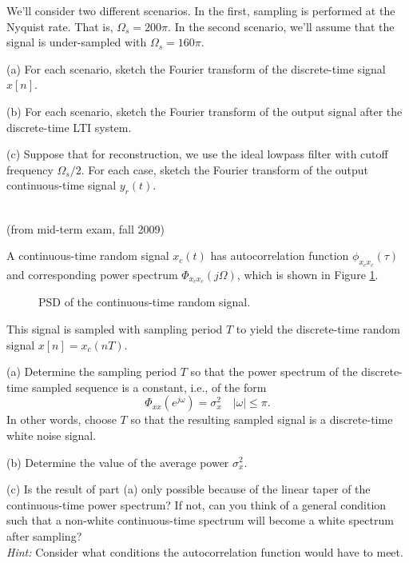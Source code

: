 \documentclass[12pt]{report}
\begin{document}
We'll consider two different scenarios. In the first, sampling is performed at the Nyquist rate. That is, $\Omega_s = 200\pi$. In the second scenario, we'll assume that the signal is under-sampled with $\Omega_s = 160\pi$.

\begin{description}
	\item{(a)} For each scenario, sketch the Fourier transform of the discrete-time signal $x[n]$.
	\item{(b)} For each scenario, sketch the Fourier transform of the output signal after the discrete-time LTI system.
	\item{(c)} Suppose that for reconstruction, we use the ideal lowpass filter with cutoff frequency $\Omega_s/2$. For each case, sketch the Fourier transform of the output continuous-time signal $y_r(t)$.
\end{description}
\mbox{}\\

  (from mid-term exam, fall 2009)

A continuous-time random signal $x_c(t)$ has autocorrelation function
$\phi_{x_c x_c}(\tau)$ and corresponding power spectrum $\Phi_{x_cx_c}(j\Omega)$, which is shown in Figure \ref{fig:CTspectrum}.
\begin{figure}[h]
	\centering
	
	\caption{PSD of the continuous-time random signal.\label{fig:CTspectrum}}
\end{figure}

This signal is sampled with sampling period $T$ to yield the discrete-time
random signal $x[n]=x_c(nT)$.
\begin{description}
\item{(a)} Determine the sampling period $T$ so that the power spectrum of
    the discrete-time sampled sequence is a constant, i.e., of the form\[
    \Phi_{xx}(e^{j\omega}) = \sigma_x^2\quad |\omega|\leq \pi.
    \]
    In other words, choose $T$ so that the resulting sampled signal is a
discrete-time white noise signal.

\item{(b)} Determine the value of the average power $\sigma_x^2$.
\item{(c)}  Is the result of part (a) only possible because of the linear
    taper of the continuous-time power spectrum?  If not, can you think of
    a general condition such that a non-white continuous-time spectrum will
    become a white spectrum after sampling? \\
\emph{Hint:} Consider what conditions the autocorrelation function would have to meet.%
\end{description}
\mbox{}\\
\end{document}
